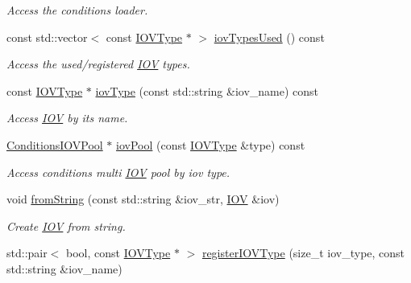 \begin{DoxyCompactItemize}
\begin{DoxyCompactList}\small\item\em Access the conditions loader. \end{DoxyCompactList}\item 
const std\+::vector$<$ const \hyperlink{class_d_d4hep_1_1_i_o_v_type}{I\+O\+V\+Type} $\ast$ $>$ \hyperlink{class_d_d4hep_1_1_conditions_1_1_conditions_manager_a6182a2159f3063306446cad03b47ba77}{iov\+Types\+Used} () const
\begin{DoxyCompactList}\small\item\em Access the used/registered \hyperlink{class_d_d4hep_1_1_i_o_v}{I\+OV} types. \end{DoxyCompactList}\item 
const \hyperlink{class_d_d4hep_1_1_i_o_v_type}{I\+O\+V\+Type} $\ast$ \hyperlink{class_d_d4hep_1_1_conditions_1_1_conditions_manager_aa0c346855c21c5a98bd4410504da28ce}{iov\+Type} (const std\+::string \&iov\+\_\+name) const
\begin{DoxyCompactList}\small\item\em Access \hyperlink{class_d_d4hep_1_1_i_o_v}{I\+OV} by its name. \end{DoxyCompactList}\item 
\hyperlink{class_d_d4hep_1_1_conditions_1_1_conditions_i_o_v_pool}{Conditions\+I\+O\+V\+Pool} $\ast$ \hyperlink{class_d_d4hep_1_1_conditions_1_1_conditions_manager_af96241d8f950b534f1b08f9822787d92}{iov\+Pool} (const \hyperlink{class_d_d4hep_1_1_i_o_v_type}{I\+O\+V\+Type} \&type) const
\begin{DoxyCompactList}\small\item\em Access conditions multi \hyperlink{class_d_d4hep_1_1_i_o_v}{I\+OV} pool by iov type. \end{DoxyCompactList}\item 
void \hyperlink{class_d_d4hep_1_1_conditions_1_1_conditions_manager_a8dc77ac3a674c26ccb78a5d23c8f6a07}{from\+String} (const std\+::string \&iov\+\_\+str, \hyperlink{class_d_d4hep_1_1_i_o_v}{I\+OV} \&iov)
\begin{DoxyCompactList}\small\item\em Create \hyperlink{class_d_d4hep_1_1_i_o_v}{I\+OV} from string. \end{DoxyCompactList}\item 
std\+::pair$<$ bool, const \hyperlink{class_d_d4hep_1_1_i_o_v_type}{I\+O\+V\+Type} $\ast$ $>$ \hyperlink{class_d_d4hep_1_1_conditions_1_1_conditions_manager_ad4a0de1bf5d55f2b110e50b06bf6d6c7}{register\+I\+O\+V\+Type} (size\+\_\+t iov\+\_\+type, const std\+::string \&iov\+\_\+name)

\end{DoxyCompactItemize}
